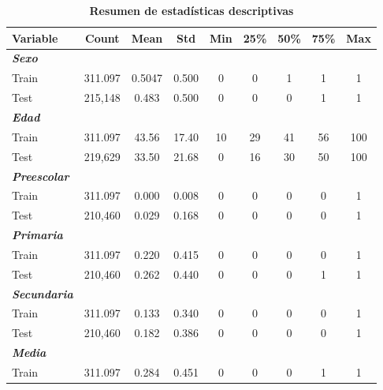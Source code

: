 \documentclass[11pt, a4paper]{article}
\begin{document}
\begin{table}[ht] 
    \centering
    \caption{\textbf{Resumen de estadísticas descriptivas}}
    \label{tab:descriptivas}
    \renewcommand{\arraystretch}{1.3} %
    \begin{tabular}{l c c c c c c c c}
    \toprule
    \textbf{Variable} & \textbf{Count} & \textbf{Mean} & \textbf{Std} & \textbf{Min} & \textbf{25\%} & \textbf{50\%} &  \textbf{75\%} &\textbf{Max} \\
    \midrule
    \textbf{\textit{Sexo}} & & & & & & & & \\
    \hspace{10pt} Train & 311.097 & 0.5047 & 0.500 & 0 & 0 & 1 & 1 & 1 \\
    \hspace{10pt} Test  & 215,148 & 0.483 & 0.500 & 0 & 0 & 0 & 1 & 1  \\
    \textbf{\textit{Edad}} & & & & & & & &\\
    \hspace{10pt} Train &  311.097 & 43.56 & 17.40 & 10 & 29 & 41 & 56 & 100 \\
    \hspace{10pt} Test  & 219,629 & 33.50 & 21.68 & 0 & 16 & 30 & 50 &100 \\
    \textbf{\textit{Preescolar}} & & & & & & & & \\
    \hspace{10pt} Train &  311.097 & 0.000 & 0.008 & 0 & 0 & 0 & 0 & 1 \\
    \hspace{10pt} Test  & 210,460 & 0.029 & 0.168 & 0 & 0 & 0 & 0 & 1 \\
    \textbf{\textit{Primaria}} & & & & & & & & \\
    \hspace{10pt} Train &  311.097 & 0.220 & 0.415 & 0 & 0 & 0 & 0 & 1 \\
    \hspace{10pt} Test  & 210,460 & 0.262 & 0.440 & 0 & 0 & 0 & 1 & 1 \\
    \textbf{\textit{Secundaria}} & & & & & & & & \\
    \hspace{10pt} Train &  311.097 & 0.133 & 0.340 & 0 & 0 & 0 & 0 & 1 \\
    \hspace{10pt} Test  & 210,460 & 0.182 & 0.386 & 0 & 0 & 0 & 0 & 1 \\
    \textbf{\textit{Media}} & & & & & & & & \\
    \hspace{10pt} Train &  311.097 & 0.284 & 0.451 & 0 & 0 & 0 & 1 & 1 \\

\end{tabular}
\end{table}
\end{document}
